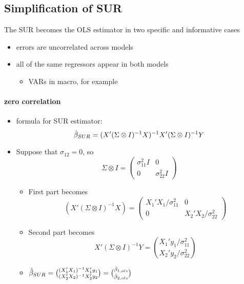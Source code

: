 \subsection{Simplification of SUR}

     The SUR becomes the OLS estimator in two specific and informative
     cases
\begin{itemize}
\item errors are uncorrelated across models
\item all of the same regressors appear in both models
\begin{itemize}
\item VARs in macro, for example
\end{itemize}
\end{itemize}

\paragraph{zero correlation}
\begin{itemize}
\item formula for SUR estimator:
  \[\hat{\beta}_{SUR} = (X'(\Sigma \otimes I)^{-1}X)^{-1}X'(\Sigma \otimes I)^{-1}Y\]
\item Suppose that $\sigma_{12} = 0$, so
  \[ \Sigma \otimes I = (\begin{matrix} \sigma_{11}^2 I & 0 \\ 0 & \sigma_{22}^2 I \end{matrix})\]
\begin{itemize}
\item First part becomes
  \[(X'( \Sigma \otimes I)^{-1} X) =
  \begin{pmatrix} X_1'X_1 / \sigma_{11}^2 & 0 \\ 0 & X_2'X_2 / \sigma_{22}^2 \end{pmatrix}\]
\item Second part becomes 
  \[X'(\Sigma \otimes I)^{-1}Y = \binom{X_1' y_1 / \sigma_{11}^2}{X_2'y_2 / \sigma_{22}^2}\]
\item $\hat{\beta}_{SUR} = \binom{(X_1'X_1)^{-1}X_1'y_1}{(X_2'X_2)^{-1}X_2'y_2} =
  \binom{\hat{\beta}_{1,ols}}{\hat{\beta}_{2,ols}}$
\end{itemize}
\end{itemize}

